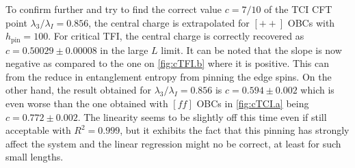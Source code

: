 	To confirm further and try to find the correct value $c=7/10$ of the TCI CFT point $\lambda_3/\lambda_I=0.856$, the central charge is extrapolated for $[++]$ OBCs with $h_\text{pin}=100$. For critical TFI, the central charge is correctly recovered as $c=0.50029\pm 0.00008$ in the large $L$ limit. It can be noted that the slope is now negative as compared to the one on \autoref{fig:cTFI.b} where it is positive. This can from the reduce in entanglement entropy from pinning the edge spins. On the other hand, the result obtained for $\lambda_3/\lambda_I=0.856$ is $c= 0.594\pm 0.002$ which is even worse than the one obtained with $[ff]$ OBCs in \autoref{fig:cTCI.a} being $c=0.772 \pm 0.002$. The linearity seems to be slightly off this time even if still acceptable with $R^2=0.999$, but it exhibits the fact that this pinning has strongly affect the system and the linear regression might no be correct, at least for such small lengths.

